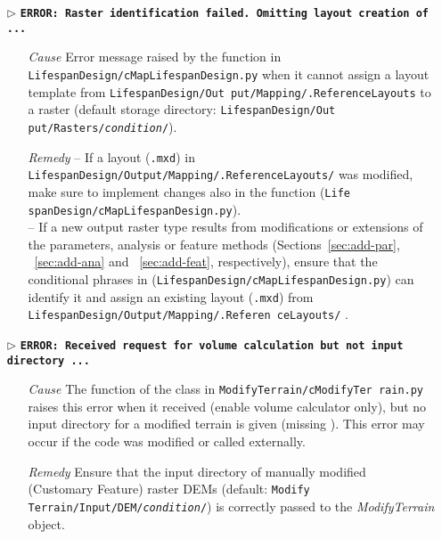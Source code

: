\begin{itemize}
	\item[$\triangleright$]\textbf{\texttt{ERROR: Raster identification failed. Omitting layout creation of ...}}
	\begin{itemize}
		\item[\textit{Cause}\hspace{0.27cm}] Error message raised by the  function in \texttt{LifespanDesign/cMapLifespanDesign.py} when it cannot assign a layout template from \texttt{LifespanDesign/Out put/Mapping/.ReferenceLayouts} to a raster (default storage directory: \texttt{LifespanDesign/Out put/Rasters/\textit{condition}/}).
		\item[\textit{Remedy}] -- If a layout (\texttt{.mxd}) in \texttt{LifespanDesign/Output/Mapping/.ReferenceLayouts/} was modified, make sure to implement changes also in the  function (\texttt{Life spanDesign/cMapLifespanDesign.py}).\\
													 -- If a new output raster type results from modifications or extensions of the parameters, analysis or feature methods (Sections~\ref{sec:add-par}, ~\ref{sec:add-ana} and ~\ref{sec:add-feat}, respectively), ensure that the conditional phrases in  (\texttt{LifespanDesign/cMapLifespanDesign.py}) can identify it and assign an existing layout (\texttt{.mxd}) from \texttt{LifespanDesign/Output/Mapping/.Referen ceLayouts/} .\\
	\end{itemize}
	
	\item[$\triangleright$]\textbf{\texttt{ERROR: Received request for volume calculation but not input directory ...}}
	\begin{itemize}
		\item[\textit{Cause}\hspace{0.27cm}] The  function of the  class in \texttt{ModifyTerrain/cModifyTer rain.py} raises this error when it received  (enable volume calculator only), but no input directory for a modified terrain is given (missing ). This error may occur if the code was modified or called externally.
		\item[\textit{Remedy}] Ensure that the input directory of manually modified (Customary Feature) raster DEMs (default: \texttt{Modify Terrain/Input/DEM/\textit{condition}/}) is correctly passed to the \textit{ModifyTerrain} object.\\
	\end{itemize}
	

\end{itemize}
